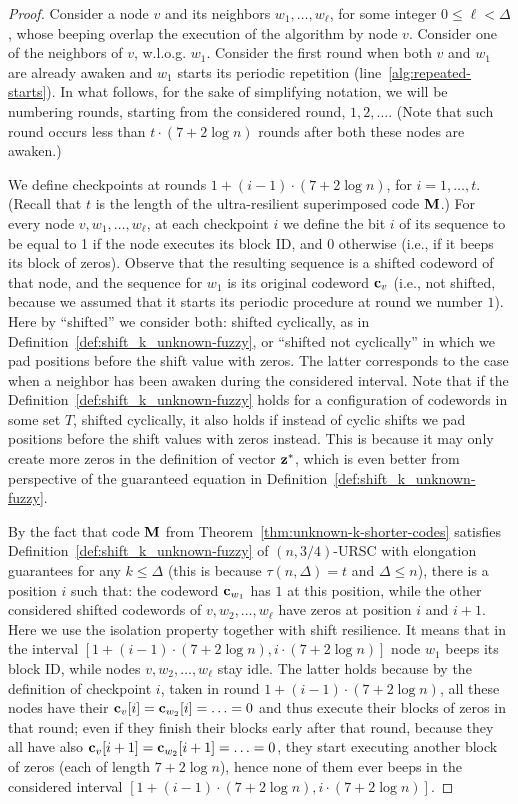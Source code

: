 \documentclass[11pt]{article}
\begin{document}
\begin{proof}
Consider a node $v$ and its neighbors $w_1,\ldots,w_\ell$, for some integer $0\le \ell< \Delta$, whose beeping overlap the execution of the algorithm by node $v$. 
Consider one of the neighbors of $v$, w.l.o.g. $w_1$. Consider the first round when both $v$ and $w_1$ are already awaken and $w_1$ starts its periodic repetition (line~\ref{alg:repeated-starts}). 
In what follows, for the sake of simplifying notation, we will be numbering rounds, starting from the considered round, $1,2,\ldots$.
(Note that such round occurs less than $t\cdot (7+2\log n)$ rounds after both these nodes are awaken.)

We define checkpoints at rounds $1+(i-1)\cdot (7+2\log n)$, for $i=1,\ldots,t$. (Recall that $t$ is 
the length 
of the ultra-resilient superimposed code ${\mathbf M}$.)
For every node $v,w_1,\ldots,w_\ell$, at each checkpoint $i$ we define the bit $i$ of its sequence to be equal to 1 if the node executes its block ID, and 0 otherwise (i.e., if it beeps its block of zeros). Observe that the resulting sequence is a shifted codeword of that node, and the sequence for $w_1$ is its original codeword ${\mathbf c}_v$ (i.e., not shifted, because we assumed that it starts its periodic procedure at round we number $1$). 
Here by ``shifted'' we consider both: shifted cyclically, as in Definition~\ref{def:shift_k_unknown-fuzzy}, or ``shifted not cyclically'' in which we pad positions before the shift value with zeros.
The latter corresponds to the case when a neighbor has been awaken during the considered interval. Note that if the Definition~\ref{def:shift_k_unknown-fuzzy} holds for a configuration of codewords in some set $T$, shifted cyclically, it also holds if instead of cyclic shifts we pad positions before the shift values with zeros instead. This is because it may only create more zeros in the definition of vector ${\mathbf z}^*$, which is even better from perspective of the guaranteed equation in Definition~\ref{def:shift_k_unknown-fuzzy}.

By 
the fact that code ${\mathbf M}$ from Theorem~\ref{thm:unknown-k-shorter-codes} satisfies Definition~\ref{def:shift_k_unknown-fuzzy} of $(n,3/4)$-URSC with elongation guarantees for any $k\le \Delta$ (this is because $\tau(n,\Delta)=t$ and $\Delta\le n$), there is a position $i$ such that:
the codeword ${\mathbf c}_{w_1}$ has $1$ at this position, while the other considered shifted codewords of $v,w_2,\ldots,w_\ell$ have zeros at position $i$ and $i+1$.
{Here we use the isolation property together with shift resilience.}
It means that in the interval $[1+(i-1)\cdot (7+2\log n),i\cdot (7+2\log n)]$ node $w_1$ beeps its block ID, while nodes $v,w_2,\ldots,w_\ell$ stay idle. The latter holds because by the definition of checkpoint $i$, taken in round $1+(i-1)\cdot (7+2\log n)$, all these nodes have their ${\mathbf c}_v[i]={\mathbf c}_{w_2}[i]=\ldots=0$ and thus execute their blocks of zeros in that round; even if they finish their blocks early after that round, because they all have also ${\mathbf c}_v[i+1]={\mathbf c}_{w_2}[i+1]=\ldots=0$, they start executing another block of zeros (each of length $7+2\log n$), hence none of them ever beeps in the considered interval $[1+(i-1)\cdot (7+2\log n),i\cdot (7+2\log n)]$.


\end{proof}
\end{document}
